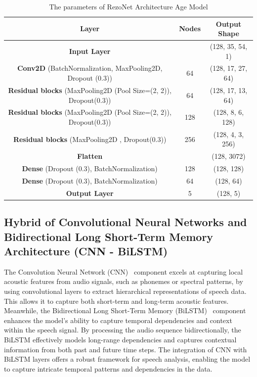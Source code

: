 \documentclass[conference, 10pt,onecolumn]{IEEEtran}
\begin{document}
\begin{table}[]
    \centering
    \begin{tabular}{|c|c|c|}
        \hline
        \textbf{Layer} & \textbf{Nodes} & \textbf{Output Shape} \\ \hline
        \textbf{Input Layer} & & (128, 35, 54, 1)\\
        \textbf{Conv2D} (BatchNormalization, MaxPooling2D, Dropout (0.3)) & 64 & (128, 17, 27, 64)\\
        \textbf{Residual blocks} (MaxPooling2D (Pool Size=(2, 2)), Dropout(0.3)) & 64 & (128, 17, 13, 64)\\
        \textbf{Residual blocks} (MaxPooling2D (Pool Size=(2, 2)), Dropout(0.3)) & 128 & (128, 8, 6, 128)\\
        \textbf{Residual blocks} (MaxPooling2D , Dropout(0.3)) & 256 & (128, 4, 3, 256)\\
        \textbf{Flatten} &  & (128, 3072)\\
        \textbf{Dense} (Dropout (0.3), BatchNormalization) & 128 & (128, 128)\\
        \textbf{Dense} (Dropout (0.3), BatchNormalization) & 64 & (128, 64)\\
        \textbf{Output Layer} & 5 & (128, 5)\\
        \hline
    \end{tabular}
    \caption{The parameters of RezoNet Architecture Age Model}
    \label{tab:RezoNet_Age}
\end{table}
\subsection{Hybrid of Convolutional Neural Networks and Bidirectional Long Short-Term Memory Architecture (CNN - BiLSTM)}
The Convolution Neural Network (CNN)~\cite{chua1998cnn} component excels at capturing local acoustic features from audio signals, such as phonemes or spectral patterns, by using convolutional layers to extract hierarchical representations of speech data. This allows it to capture both short-term and long-term acoustic features. Meanwhile, the  Bidirectional Long Short-Term Memory (BiLSTM)~\cite{yu2019review} component enhances the model's ability to capture temporal dependencies and context within the speech signal. By processing the audio sequence bidirectionally, the BiLSTM effectively models long-range dependencies and captures contextual information from both past and future time steps. The integration of CNN with BiLSTM layers offers a robust framework for speech analysis, enabling the model to capture intricate temporal patterns and dependencies in the data.
\end{document}
